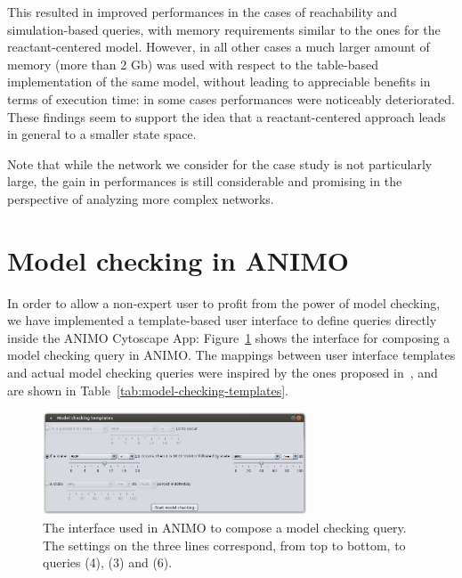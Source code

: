 \documentclass{llncs}
\begin{document}
This resulted in improved performances in the cases of reachability and simulation-based queries, with memory requirements similar to the ones for
the reactant-centered model. However, in all other cases a much larger amount of memory (more than 2 Gb) was used
with respect to the table-based implementation of the same model, without leading to appreciable benefits in terms of execution time:
in some cases performances were noticeably deteriorated.
These findings seem to support the idea that a reactant-centered approach
leads in general to a smaller state space.

Note that while the network we consider for the case study is not particularly large, the gain in performances is still considerable
and promising in the perspective of analyzing more complex networks.



\section{Model checking in ANIMO}\label{sec:animo-model-checking-ui}
In order to allow a non-expert user to profit from the power of model checking, we have implemented
a template-based user interface to define queries directly inside the ANIMO Cytoscape App:
Figure~\ref{fig:model-checking-ui} shows the interface for composing a model checking query in ANIMO.
The mappings between user interface templates and actual model checking queries were inspired
by the ones proposed in~\cite{hidde-templates}, and are shown in Table~\ref{tab:model-checking-templates}.

\begin{figure}[htb]
  \begin{center}
    \includegraphics[width=0.7\textwidth]{images/model_checking_ui}
  \end{center}
  \caption{The interface used in ANIMO to compose a model checking query.
  The settings on the three lines correspond, from top to bottom,
  to queries (4), (3) and (6).\label{fig:model-checking-ui}}
\end{figure}
\end{document}
